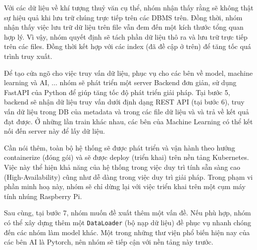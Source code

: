 Với các dữ liệu về khí tượng thuỷ văn cụ thể, nhóm nhận thấy rằng sẽ không thật sự hiệu quả khi lưu trữ chúng trực tiếp trên các DBMS trên. Đồng thời, nhóm nhận thấy việc lưu trữ dữ liệu trên file vẫn đem đến một kích thước tổng quan hợp lý. Vì vậy, nhóm quyết định sẽ tách phần dữ liệu thô ra và lưu trữ trực tiếp trên các files. Đồng thời kết hợp với các index (đã đề cập ở trên) để tăng tốc quá trình truy xuất.

Để tạo cửa ngõ cho việc truy vấn dữ liệu, phục vụ cho các bên về model, machine learning và AI, ... nhóm sẽ phát triển một server Backend đơn giản, sử dụng FastAPI của Python để giúp tăng tốc độ phát triển giải pháp. Tại bước 5, backend sẽ nhận dữ liệu truy vấn dưới định dạng REST API (tại bước 6), truy vấn dữ liệu trong DB của metadata và trong các file dữ liệu và và trả về kết quả đạt được. Ở những lần train khác nhau, các bên của Machine Learning có thể kết nối đến server này để lấy dữ liệu.

Cần nói thêm, toàn bộ hệ thống sẽ được phát triển và vận hành theo hướng containerize (đóng gói) và sẽ được deploy (triển khai) trên nền tảng Kubernetes. Việc này thể hiện khả năng của hệ thống trong việc duy trì tính sẵn sàng cao (High-Availability) cũng như dễ dàng trong việc duy trì giải pháp. Trong phạm vi phần minh hoạ này, nhóm sẽ chỉ dừng lại với việc triển khai trên một cụm máy tính nhúng Raspberry Pi.

Sau cùng, tại bước 7, nhóm muốn đề xuất thêm một vấn đề. Nếu phù hợp, nhóm có thể xây dựng thêm một \texttt{DataLoader} (bộ nạp dữ liệu) đề phục vụ nhanh chóng đến các nhóm làm model khác. Một trong những thư viện phổ biến hiện nay của các bên AI là Pytorch, nên nhóm sẽ tiếp cận với nền tảng này trước.